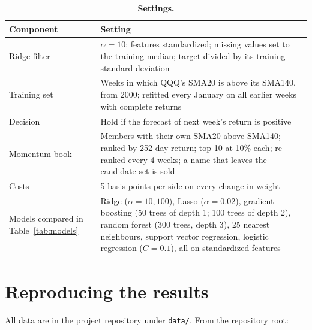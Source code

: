 \documentclass[11pt]{article}
\begin{document}
\begin{table}[H]
\centering\small
\caption*{\textbf{Settings.}}
\begin{tabularx}{\textwidth}{@{}p{}X@{}}
\toprule
Component & Setting \\
\midrule
Ridge filter & $\alpha = 10$; features standardized; missing values set to the training median; target divided by its training standard deviation \\
\addlinespace
Training set & Weeks in which QQQ's SMA20 is above its SMA140, from 2000; refitted every January on all earlier weeks with complete returns \\
\addlinespace
Decision & Hold if the forecast of next week's return is positive \\
\addlinespace
Momentum book & Members with their own SMA20 above SMA140; ranked by 252-day return; top 10 at 10\% each; re-ranked every 4 weeks; a name that leaves the candidate set is sold \\
\addlinespace
Costs & 5 basis points per side on every change in weight \\
\addlinespace
Models compared in Table~\ref{tab:models} & Ridge ($\alpha = 10, 100$), Lasso ($\alpha = 0.02$), gradient boosting (50 trees of depth 1; 100 trees of depth 2), random forest (300 trees, depth 3), 25 nearest neighbours, support vector regression, logistic regression ($C = 0.1$), all on standardized features \\
\bottomrule
\end{tabularx}
\end{table}

\section{Reproducing the results}

All data are in the project repository under \texttt{data/}. From the repository root:
\end{document}
